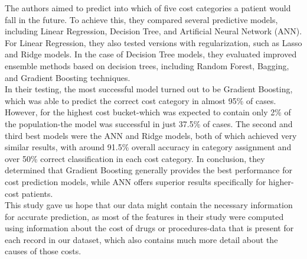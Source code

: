 The authors aimed to predict into which of five cost categories a patient would fall in the future. To achieve this, they compared several predictive models, including Linear Regression, Decision Tree, and Artificial Neural Network (ANN). For Linear Regression, they also tested versions with regularization, such as Lasso and Ridge models. In the case of Decision Tree models, they evaluated improved ensemble methods based on decision trees, including Random Forest, Bagging, and Gradient Boosting techniques.
\\

In their testing, the most successful model turned out to be Gradient Boosting, which was able to predict the correct cost category in almost 95\% of cases. However, for the highest cost bucket-which was expected to contain only 2\% of the population-the model was successful in just 37.5\% of cases. The second and third best models were the ANN and Ridge models, both of which achieved very similar results, with around 91.5\% overall accuracy in category assignment and over 50\% correct classification in each cost category. In conclusion, they determined that Gradient Boosting generally provides the best performance for cost prediction models, while ANN offers superior results specifically for higher-cost patients.
\\

This study gave us hope that our data might contain the necessary information for accurate prediction, as most of the features in their study were computed using information about the cost of drugs or procedures-data that is present for each record in our dataset, which also contains much more detail about the causes of those costs.